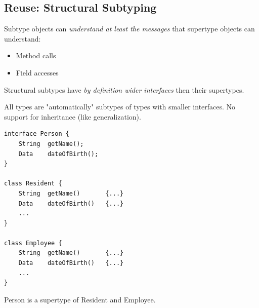 \subsection{Reuse: Structural Subtyping}
Subtype objects can \emph{understand at least the messages} that supertype objects can understand:
\begin{itemize}
	\item Method calls
	\item Field accesses
\end{itemize}
Structural subtypes have \emph{by definition wider interfaces} then their supertypes.

All types are "automatically" subtypes of types with smaller interfaces. No support for inheritance (like generalization). 
\begin{lstlisting}[caption=Structural Subtyping Example]
interface Person {
	String 	getName();
	Data	dateOfBirth();
}

class Resident {
	String 	getName()		{...}
	Data	dateOfBirth()	{...}
	...
}	

class Employee {
	String 	getName()		{...}
	Data	dateOfBirth()	{...}
	...
}

\end{lstlisting}
Person is a supertype of Resident and Employee.



